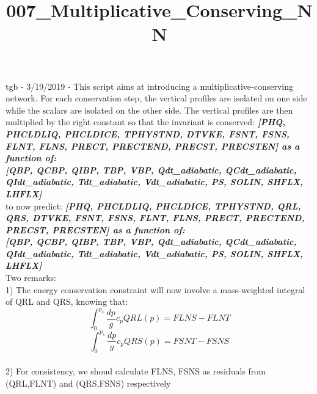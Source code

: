 \documentclass[11pt]{article}
\title{007\_Multiplicative\_Conserving\_NN}
\begin{document}
    
    
    \maketitle
    
    

    
    tgb - 3/19/2019 - This script aims at introducing a
multiplicative-conserving network. For each conservation step, the
vertical profiles are isolated on one side while the scalars are
isolated on the other side. The vertical profiles are then multiplied by
the right constant so that the invariant is conserved: \textbf{\emph{
{[}PHQ, PHCLDLIQ, PHCLDICE, TPHYSTND, DTVKE, FSNT, FSNS, FLNT, FLNS,
PRECT, PRECTEND, PRECST, PRECSTEN{]} as a function of:\\
{[}QBP, QCBP, QIBP, TBP, VBP, Qdt\_adiabatic, QCdt\_adiabatic,
QIdt\_adiabatic, Tdt\_adiabatic, Vdt\_adiabatic, PS, SOLIN, SHFLX,
LHFLX{]}\\
}} to now predict: \textbf{\emph{ {[}PHQ, PHCLDLIQ, PHCLDICE, TPHYSTND,
QRL, QRS, DTVKE, FSNT, FSNS, FLNT, FLNS, PRECT, PRECTEND, PRECST,
PRECSTEN{]} as a function of:\\
{[}QBP, QCBP, QIBP, TBP, VBP, Qdt\_adiabatic, QCdt\_adiabatic,
QIdt\_adiabatic, Tdt\_adiabatic, Vdt\_adiabatic, PS, SOLIN, SHFLX,
LHFLX{]} }}\\
Two remarks:\\
1) The energy conservation constraint will now involve a mass-weighted
integral of QRL and QRS, knowing that:\\
\[
\int_{0}^{p_{s}}\frac{dp}{g}c_{p}QRL\left(p\right)=FLNS-FLNT
\] \[
\int_{0}^{p_{s}}\frac{dp}{g}c_{p}QRS\left(p\right)=FSNT-FSNS
\]\\
2) For consistency, we shoud calculate FLNS, FSNS as residuals from
(QRL,FLNT) and (QRS,FSNS) respectively
\end{document}
